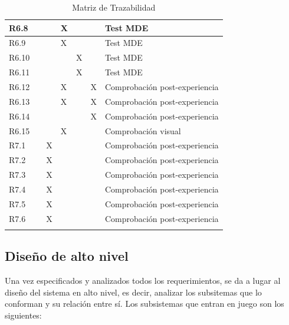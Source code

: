 \begin{longtable}[c]{lllllll}
R6.8 &  &  & X &  &  & Test MDE \\ \hline
R6.9 &  &  & X &  &  & Test MDE \\ \hline
R6.10 &  &  &  & X &  & Test MDE \\ \hline
R6.11 &  &  &  & X &  & Test MDE \\ \hline
R6.12 &  &  & X &  & X & Comprobación post-experiencia \\ \hline
R6.13 &  &  & X &  & X & Comprobación post-experiencia \\ \hline
R6.14 &  &  &  &  & X & Comprobación post-experiencia \\ \hline
R6.15 &  &  & X &  &  & Comprobación visual \\ \hline
R7.1 &  & X &  &  &  & Comprobación post-experiencia \\ \hline
R7.2 &  & X &  &  &  & Comprobación post-experiencia \\ \hline
R7.3 &  & X &  &  &  & Comprobación post-experiencia \\ \hline
R7.4 &  & X &  &  &  & Comprobación post-experiencia \\ \hline
R7.5 &  & X &  &  &  & Comprobación post-experiencia \\ \hline
R7.6 &  & X &  &  &  & Comprobación post-experiencia \\ \hline
\caption{Matriz de Trazabilidad}
\label{tab:matrizTrazabilidad}\\
\end{longtable}

\normalsize


\subsection{Diseño de alto nivel}

Una vez especificados y analizados todos los requerimientos, se da a lugar al diseño del sistema en alto nivel, es decir, analizar los subsitemas que lo conforman y su relación entre sí. Los subsistemas que entran en juego son los siguientes:

